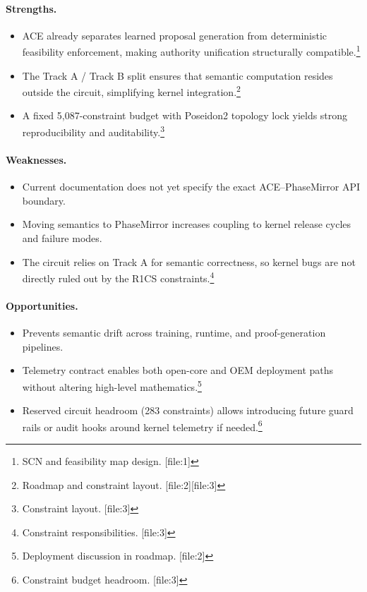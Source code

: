 \documentclass[11pt]{article}
\begin{document}
\paragraph{Strengths.}
\begin{itemize}[leftmargin=*]
  \item ACE already separates learned proposal generation from deterministic feasibility enforcement, making authority unification structurally compatible.\footnote{SCN and feasibility map design. [file:1]}
  \item The Track A / Track B split ensures that semantic computation resides outside the circuit, simplifying kernel integration.\footnote{Roadmap and constraint layout. [file:2][file:3]}
  \item A fixed 5{,}087-constraint budget with Poseidon2 topology lock yields strong reproducibility and auditability.\footnote{Constraint layout. [file:3]}
\end{itemize}

\paragraph{Weaknesses.}
\begin{itemize}[leftmargin=*]
  \item Current documentation does not yet specify the exact ACE--PhaseMirror API boundary.
  \item Moving semantics to PhaseMirror increases coupling to kernel release cycles and failure modes.
  \item The circuit relies on Track A for semantic correctness, so kernel bugs are not directly ruled out by the R1CS constraints.\footnote{Constraint responsibilities. [file:3]}
\end{itemize}

\paragraph{Opportunities.}
\begin{itemize}[leftmargin=*]
  \item Prevents semantic drift across training, runtime, and proof-generation pipelines.
  \item Telemetry contract enables both open-core and OEM deployment paths without altering high-level mathematics.\footnote{Deployment discussion in roadmap. [file:2]}
  \item Reserved circuit headroom (283 constraints) allows introducing future guard rails or audit hooks around kernel telemetry if needed.\footnote{Constraint budget headroom. [file:3]}
\end{itemize}
\end{document}
